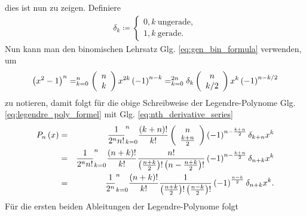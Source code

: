 \documentclass{book}
\let\sum\relax
\DeclareMathOperator*{\sum}{\raisebox{-3.5pt}{\scalebox{2}{\rotatebox{1}{{\bask Σ}}}}}
\begin{document}
%
dies ist nun zu zeigen. Definiere
%
\begin{eqnarray}
\delta_k \coloneqq \begin{cases}
0, k\:\text{ungerade},\\
1, k\:\text{gerade}.
\end{cases}
\end{eqnarray}
%
Nun kann man den binomischen Lehrsatz Glg. \eqref{eq:gen_bin_formula} verwenden, um
%
\begin{eqnarray}
\left(x^2 - 1\right)^n = \sum_{k = 0}^{n}\left(\begin{array}{c}
n\\
k
\end{array}\right)x^{2k}\left(-1\right)^{n - k} = \sum_{k = 0}^{2n}\delta_k\left(\begin{array}{c}
n\\
k/2
\end{array}\right)x^k\left(-1\right)^{n - k/2}\label{eq:gen_bin_formula_legendre}
\end{eqnarray}
%
zu notieren, damit folgt für die obige Schreibweise der Legendre-Polynome Glg. \eqref{eq:legendre_poly_formel} mit Glg. \eqref{eq:nth_derivative_series}
%
\begin{eqnarray}
P_n\left(x\right) & = & \frac{1}{2^nn!}\sum_{k = 0}^{n}\frac{\left(k + n\right)!}{k!}\left(\begin{array}{c}
n\\
\frac{k + n}{2}
\end{array}\right)\left(-1\right)^{n - \frac{k + n}{2}}\delta_{k + n}x^k\nonumber\\
& = & \frac{1}{2^nn!}\sum_{k = 0}^{n}\frac{\left(n + k\right)!}{k!}\frac{n!}{\left(\frac{n + k}{2}\right)!\left(n - \frac{n + k}{2}\right)!}\left(-1\right)^{n - \frac{k + n}{2}}\delta_{n + k}x^k\nonumber\\
& = & \frac{1}{2^n}\sum_{k = 0}^{n}\frac{\left(n + k\right)!}{k!}\frac{1}{\left(\frac{n + k}{2}\right)!\left(\frac{n - k}{2}\right)!}\left(-1\right)^{\frac{n - k}{2}}\delta_{n + k}x^k.
\end{eqnarray}
%
Für die ersten beiden Ableitungen der Legendre-Polynome folgt
%
\end{document}
